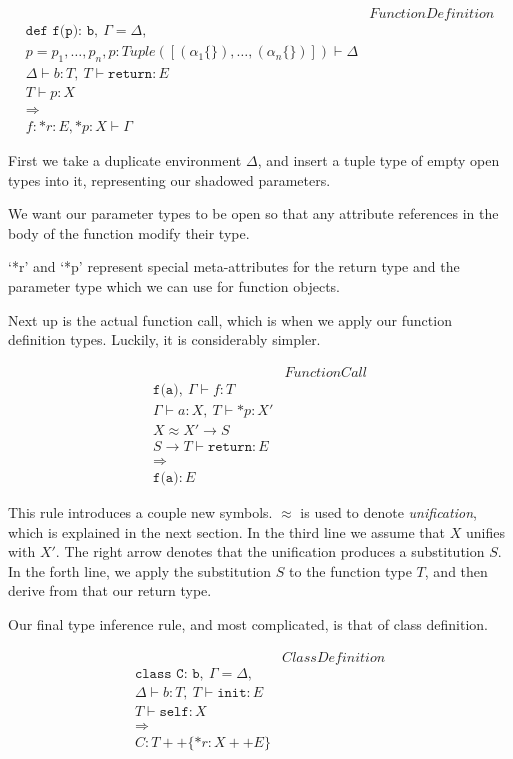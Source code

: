 \documentclass{article}
\begin{document}
\begin{align*}
&FunctionDefinition\\
\texttt{def f(p): b},\ \Gamma = \Delta, \\
p = p_1,\dots,p_n, p : Tuple([(\alpha_1\{\}),\dots,(\alpha_n\{\})]) \vdash \Delta \\
\Delta \vdash b : T,\ T \vdash \texttt{return}:E \\
T \vdash p : X \\
\Longrightarrow \\
f : {*r : E, *p : X} \vdash \Gamma
\end{align*}

First we take a duplicate environment $\Delta$, and insert a tuple type of
empty open types into it, representing our shadowed parameters.

We want our parameter types to be open so that any attribute references in the
body of the function modify their type.

`*r' and `*p' represent special meta-attributes for the return type and the
parameter type which we can use for function objects.

Next up is the actual function call, which is when we apply our function
definition types. Luckily, it is considerably simpler.

\begin{align*}
&FunctionCall\\
\texttt{f(a)},\ \Gamma \vdash f : T \\
\Gamma \vdash a : X,\ T \vdash *p : X' \\
X \approx X' \rightarrow S \\
S \rightarrow T \vdash \texttt{return} : E\\
\Longrightarrow \\
\texttt{f(a)} : E
\end{align*}

This rule introduces a couple new symbols. $\approx$ is used to denote
\emph{unification}, which is explained in the next section. In the third line
we assume that $X$ unifies with $X'$. The right arrow denotes that the
unification produces a substitution $S$. In the forth line, we apply the
substitution $S$ to the function type $T$, and then derive from that our return
type.

Our final type inference rule, and most complicated, is that of class definition.

\begin{align*}
&ClassDefinition\\
\texttt{class C: b},\ \Gamma = \Delta, \\
\Delta \vdash b : T,\ T \vdash \texttt{init}:E \\
T \vdash \texttt{self} : X \\
\Longrightarrow \\
C : T ++ \{*r : X ++ E \}
\end{align*}
\end{document}
